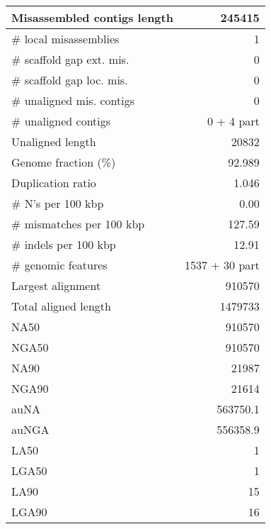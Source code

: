 \documentclass[12pt,a4paper]{article}
\begin{document}
\begin{table}[ht]
\begin{center}
\begin{tabular}{|l*{1}{|r}|}
Misassembled contigs length & 245415 \\ \hline
\# local misassemblies & 1 \\ \hline
\# scaffold gap ext. mis. & 0 \\ \hline
\# scaffold gap loc. mis. & 0 \\ \hline
\# unaligned mis. contigs & 0 \\ \hline
\# unaligned contigs & 0 + 4 part \\ \hline
Unaligned length & 20832 \\ \hline
Genome fraction (\%) & 92.989 \\ \hline
Duplication ratio & 1.046 \\ \hline
\# N's per 100 kbp & 0.00 \\ \hline
\# mismatches per 100 kbp & 127.59 \\ \hline
\# indels per 100 kbp & 12.91 \\ \hline
\# genomic features & 1537 + 30 part \\ \hline
Largest alignment & 910570 \\ \hline
Total aligned length & 1479733 \\ \hline
NA50 & 910570 \\ \hline
NGA50 & 910570 \\ \hline
NA90 & 21987 \\ \hline
NGA90 & 21614 \\ \hline
auNA & 563750.1 \\ \hline
auNGA & 556358.9 \\ \hline
LA50 & 1 \\ \hline
LGA50 & 1 \\ \hline
LA90 & 15 \\ \hline
LGA90 & 16 \\ \hline
\end{tabular}
\end{center}
\end{table}
\end{document}
